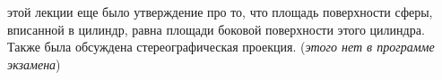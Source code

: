  этой лекции еще было утверждение про то, что площадь поверхности сферы, вписанной в цилиндр, равна площади боковой поверхности этого цилиндра. Также была обсуждена стереографическая проекция. (\textit{этого нет в программе экзамена})
\newpage